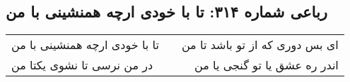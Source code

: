 \begin{center}
\section*{رباعی شماره ۳۱۴: تا با خودی ارچه همنشینی با من}
\label{sec:sh314}
\begin{longtable}{l p{0.5cm} r}
تا با خودی ارچه همنشینی با من
&&
ای بس دوری که از تو باشد تا من
\\
در من نرسی تا نشوی یکتا من
&&
اندر ره عشق یا تو گنجی یا من
\\
\end{longtable}
\end{center}
